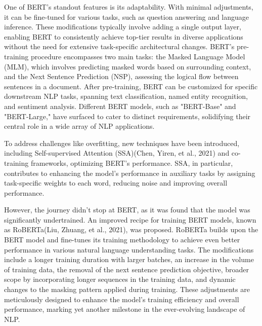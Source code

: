 \documentclass[fleqn,10pt]{thescipub} %
\begin{document}
One of BERT's standout features is its adaptability. With minimal adjustments, it can be fine-tuned for various tasks, such as question answering and language inference. These modifications typically involve adding a single output layer, enabling BERT to consistently achieve top-tier results in diverse applications without the need for extensive task-specific architectural changes. BERT's pre-training procedure encompasses two main tasks: the Masked Language Model (MLM), which involves predicting masked words based on surrounding context, and the Next Sentence Prediction (NSP), assessing the logical flow between sentences in a document. After pre-training, BERT can be customized for specific downstream NLP tasks, spanning text classification, named entity recognition, and sentiment analysis. Different BERT models, such as "BERT-Base" and "BERT-Large," have surfaced to cater to distinct requirements, solidifying their central role in a wide array of NLP applications.

To address challenges like overfitting, new techniques have been introduced, including Self-supervised Attention (SSA)(Chen, Yiren, et al., 2021) and co-training frameworks, optimizing BERT's performance. SSA, in particular, contributes to enhancing the model's performance in auxiliary tasks by assigning task-specific weights to each word, reducing noise and improving overall performance.

However, the journey didn't stop at BERT, as it was found that the model was significantly undertrained. An improved recipe for training BERT models, known as RoBERTa(Liu, Zhuang, et al., 2021), was proposed. RoBERTa builds upon the BERT model and fine-tunes its training methodology to achieve even better performance in various natural language understanding tasks. The modifications include a longer training duration with larger batches, an increase in the volume of training data, the removal of the next sentence prediction objective, broader scope by incorporating longer sequences in the training data, and dynamic changes to the masking pattern applied during training. These adjustments are meticulously designed to enhance the model's training efficiency and overall performance, marking yet another milestone in the ever-evolving landscape of NLP.
\end{document}
